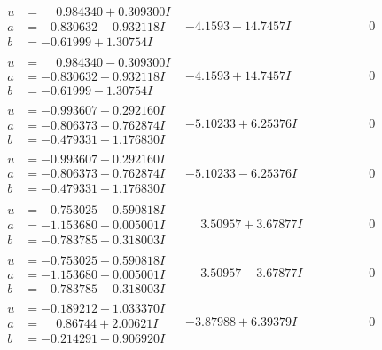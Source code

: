 \documentclass[1p]{elsarticle_modified}
\theoremstyle{definition}
\begin{document}
$$\begin{array}{c|c|c}
\begin{aligned}
u &= \phantom{-}0.984340 + 0.309300 I \\
a &= -0.830632 + 0.932118 I \\
b &= -0.61999 + 1.30754 I\end{aligned}
 & -4.1593 - 14.7457 I & \phantom{-0.000000 } 0 \\ \hline\begin{aligned}
u &= \phantom{-}0.984340 - 0.309300 I \\
a &= -0.830632 - 0.932118 I \\
b &= -0.61999 - 1.30754 I\end{aligned}
 & -4.1593 + 14.7457 I & \phantom{-0.000000 } 0 \\ \hline\begin{aligned}
u &= -0.993607 + 0.292160 I \\
a &= -0.806373 - 0.762874 I \\
b &= -0.479331 - 1.176830 I\end{aligned}
 & -5.10233 + 6.25376 I & \phantom{-0.000000 } 0 \\ \hline\begin{aligned}
u &= -0.993607 - 0.292160 I \\
a &= -0.806373 + 0.762874 I \\
b &= -0.479331 + 1.176830 I\end{aligned}
 & -5.10233 - 6.25376 I & \phantom{-0.000000 } 0 \\ \hline\begin{aligned}
u &= -0.753025 + 0.590818 I \\
a &= -1.153680 + 0.005001 I \\
b &= -0.783785 + 0.318003 I\end{aligned}
 & \phantom{-}3.50957 + 3.67877 I & \phantom{-0.000000 } 0 \\ \hline\begin{aligned}
u &= -0.753025 - 0.590818 I \\
a &= -1.153680 - 0.005001 I \\
b &= -0.783785 - 0.318003 I\end{aligned}
 & \phantom{-}3.50957 - 3.67877 I & \phantom{-0.000000 } 0 \\ \hline\begin{aligned}
u &= -0.189212 + 1.033370 I \\
a &= \phantom{-}0.86744 + 2.00621 I \\
b &= -0.214291 - 0.906920 I\end{aligned}
 & -3.87988 + 6.39379 I & \phantom{-0.000000 } 0 \\ \hline\begin{aligned}

\end{aligned}
\end{array}$$
\end{document}
